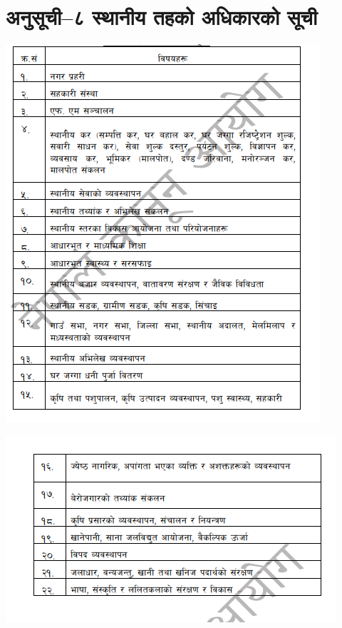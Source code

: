 \section{अनुसूची–८ स्थानीय तहको अधिकारको सूची}

\includegraphics[width=\textwidth]{images/43-1.png}

\includegraphics[width=\textwidth]{images/43-2.png}